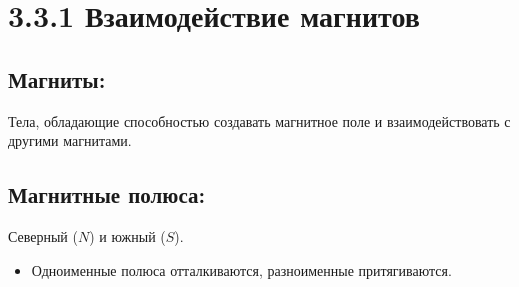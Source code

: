 \documentclass[a4paper,12pt]{article}
\begin{document}
\begin{center}
\end{center}

\vspace{-2.5em}










\section*{3.3.1 Взаимодействие магнитов}
\vspace{-9pt}
\subsection*{Магниты:}
\vspace{-3pt}
Тела, обладающие способностью создавать магнитное поле и взаимодействовать с другими магнитами.

\vspace{-9pt}
\subsection*{Магнитные полюса:}
\vspace{-3pt}
Северный ($N$) и южный ($S$).
\begin{itemize}
    \item Одноименные полюса отталкиваются, разноименные притягиваются.
\end{itemize}
\end{document}
